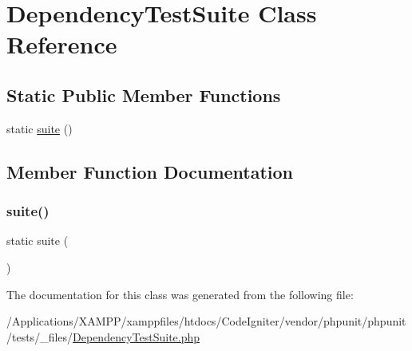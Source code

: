 \hypertarget{class_dependency_test_suite}{}\section{Dependency\+Test\+Suite Class Reference}
\label{class_dependency_test_suite}
\subsection*{Static Public Member Functions}
\begin{DoxyCompactItemize}
\item 
static \mbox{\hyperlink{class_dependency_test_suite_ae613daa28fb6b747c1940f6c9becccf7}{suite}} ()
\end{DoxyCompactItemize}


\subsection{Member Function Documentation}
\mbox{\label{class_dependency_test_suite_ae613daa28fb6b747c1940f6c9becccf7}} 
\subsubsection{\texorpdfstring{suite()}{suite()}}
{\footnotesize\ttfamily static suite (\begin{DoxyParamCaption}{ }\end{DoxyParamCaption})\hspace{0.3cm}{\ttfamily [static]}}



The documentation for this class was generated from the following file\+:\begin{DoxyCompactItemize}
\item 
/\+Applications/\+X\+A\+M\+P\+P/xamppfiles/htdocs/\+Code\+Igniter/vendor/phpunit/phpunit/tests/\+\_\+files/\mbox{\hyperlink{_dependency_test_suite_8php}{Dependency\+Test\+Suite.\+php}}\end{DoxyCompactItemize}
